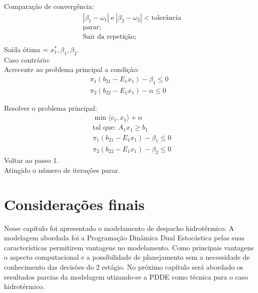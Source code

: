 Compara\c c\~ao de converg\^encia:
\begin{align*}
	&|\beta_1 - \omega_1|\hspace{3pt} \mbox{e} \hspace{3pt} |\beta_2 - \omega_2|< \mbox{toler\^ancia}\\
	&\mbox{parar;}\\
	&\mbox{Sair da repeti\c c\~ao;}\\
\end{align*}
Sa\'ida \'otima = $x_1^{*}, \beta_1, \beta_2.$ \\
Caso contr\'ario:\\

Acrecente ao problema principal a condi\c c\~ao:
\begin{align*}
	\pi_1(b_{21} - E_1x_1) - \beta_1 \leq 0\\
	\pi_2(b_{22} - E_1x_1) - \alpha \leq 0
\end{align*}

Resolver o problema principal:
\begin{align*}
&\min \langle c_1,x_1\rangle + \alpha \nonumber\\
&\mbox{tal que: }	A_1 x_1 \geq b_1\\
&\pi_1(b_{21} - E_1x_1) - \beta_1 \leq 0\\
&\pi_2(b_{22} - E_1x_1) - \beta_2 \leq 0
\end{align*}
Voltar ao passo 1.\\
Atingido o número de itera\c c\~oes parar.\\

\section{Considera\c c\~oes finais}
Nesse cap\'itulo foi apresentado o modelamento de despacho hidrot\'ermico. A modelagem abordada foi a Programa\c c\~ao
Din\^amica Dual Estoc\'astica pelas suas caracter\'isticas permitirem vantagens no modelamento. Como principais
vantagens o aspecto computacional e a possibilidade de planejamento sem a necessidade de conhecimento das decis\~oes do 2
est\'agio. No pr\'oximo cap\'itulo ser\'a abordado os resultados parcias da modelagem utizando-se a PDDE como t\'ecnica para o
caso hidrot\'ermico.

